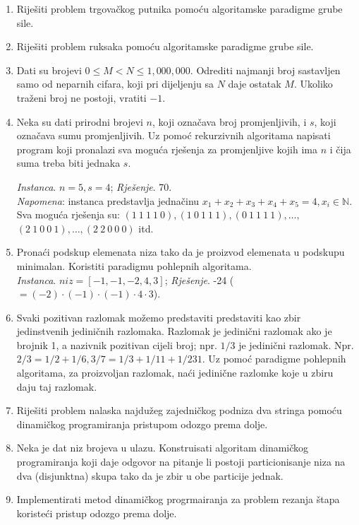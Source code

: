\begin{enumerate}
	\item Riješiti problem trgovačkog putnika pomoću algoritamske paradigme grube sile.
	\item Riješiti problem ruksaka pomoću algoritamske paradigme grube sile.
	\item Dati  su brojevi  $0 \leq  M  <  N  \leq  1,000,000$. Odrediti  najmanji  broj  sastavljen  samo  od 
	neparnih cifara, koji pri dijeljenju sa $N$ daje ostatak $M$. Ukoliko traženi broj ne postoji, vratiti $−1$. 
	
	 \item Neka su dati prirodni brojevi $n$, koji označava broj promjenljivih, i $s$, koji označava sumu promjenljivih. Uz
pomoć rekurzivnih algoritama napisati program koji pronalazi sva moguća rješenja
za promjenljive  kojih ima $n$ i  čija   suma treba biti jednaka $ s$. 

\textit{Instanca}. $n = 5, s = 4$;
\textit{Rješenje}. 70. \\
\textit{Napomena}:
instanca predstavlja jednačinu $x_1 + x_2 + x_3 + x_4 + x_5 = 4, x_i \in \mathbb{N}$. 
Sva moguća rješenja su:
$(1\ 1\ 1\ 1\ 0), (1\ 0\ 1\ 1\ 1), (0\ 1\ 1\ 1\ 1), \ldots ,$ $(2\ 1\ 0\ 0\ 1), \ldots , (2\ 2\ 0\ 0\ 0)$ itd.
	\item Pronaći podskup elemenata niza tako da je proizvod elemenata u podskupu minimalan. Koristiti paradigmu pohlepnih algoritama.\\
	 \textit{Instanca}. $niz = [ -1, -1, -2, 4, 3]$; \textit{Rješenje}.  -24 ($=(-2 )\cdot (-1) \cdot (-1) \cdot 4 \cdot 3$). 
	
	\item Svaki pozitivan razlomak možemo predstaviti predstaviti kao zbir jedinstvenih jediničnih razlomaka. Razlomak je jedinični razlomak ako je brojnik 1, a nazivnik pozitivan cijeli broj; npr. $1/3$ je jedinični razlomak. Npr. $2/3= 1/2 + 1/6, 3/7=1/3 + 1/11 + 1/231.$   Uz pomoć paradigme pohlepnih algoritama, za proizvoljan razlomak, naći jedinične razlomke koje u zbiru daju taj razlomak.  
	
	
	\item Riješiti problem nalaska najdužeg zajedničkog podniza dva stringa pomoću dinamičkog programiranja pristupom odozgo prema dolje. 
	
	\item Neka je dat niz brojeva u ulazu. Konstruisati algoritam dinamičkog programiranja koji daje odgovor na pitanje li postoji particionisanje niza na dva (disjunktna) skupa tako da je zbir u obe particije jednak.
	\item Implementirati metod dinamičkog progrmairanja  za problem rezanja štapa koristeći pristup odozgo prema dolje.
	

\end{enumerate}
